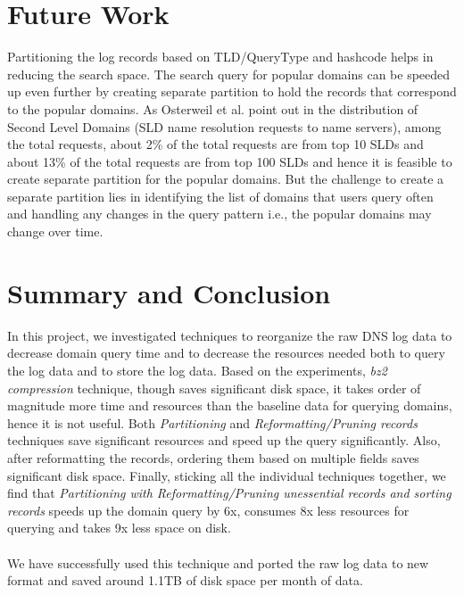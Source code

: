 \documentclass[11pt,a4paper]{article}
\begin{document}
\section{Future Work}
Partitioning the log records based on TLD/QueryType and hashcode helps in reducing the search space. The search query for popular domains can be speeded up even further by creating separate partition to hold the records that correspond to the popular domains. As Osterweil et al.\cite{uspatent} point out in the distribution of Second Level Domains (SLD name resolution requests to name servers), among the total requests, about 2\% of the total requests are from top 10 SLDs and about 13\% of the total requests are from top 100 SLDs and hence it is feasible to create separate partition for the popular domains. But the challenge to create a separate partition lies in identifying the list of domains that users query often and handling any changes in the query pattern i.e., the popular domains may change over time.

\section{Summary and Conclusion} 
In this project, we investigated techniques to reorganize the raw DNS log data to decrease domain query time and to decrease the resources needed both to query the log data and to store the log data. Based on the experiments, \textit{bz2 compression} technique, though saves significant disk space, it takes order of magnitude more time and resources than the baseline data for querying domains, hence it is not useful. Both \textit{Partitioning} and \textit{Reformatting/Pruning records} techniques save significant resources and speed up the query significantly. Also, after reformatting the records, ordering them based on multiple fields saves significant disk space. Finally, sticking all the individual techniques together, we find that \textit{Partitioning with Reformatting/Pruning unessential records and sorting records} speeds up the domain query by 6x, consumes 8x less resources for querying and takes 9x less space on disk. 
\\\\
We have successfully used this technique and ported the raw log data to new format and saved around 1.1TB of disk space per month of data.
\end{document}
